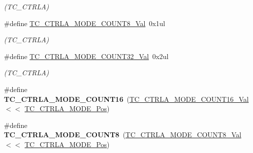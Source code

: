 \begin{DoxyCompactItemize}
\begin{DoxyCompactList}\small\item\em (T\+C\+\_\+\+C\+T\+R\+L\+A) \end{DoxyCompactList}\item 
\hypertarget{group___s_a_m_l21___t_c_ga5e47a24a6c4391f521cae7e09c51fe85}{}\#define \hyperlink{group___s_a_m_l21___t_c_ga5e47a24a6c4391f521cae7e09c51fe85}{T\+C\+\_\+\+C\+T\+R\+L\+A\+\_\+\+M\+O\+D\+E\+\_\+\+C\+O\+U\+N\+T8\+\_\+\+Val}~0x1ul\label{group___s_a_m_l21___t_c_ga5e47a24a6c4391f521cae7e09c51fe85}

\begin{DoxyCompactList}\small\item\em (T\+C\+\_\+\+C\+T\+R\+L\+A) \end{DoxyCompactList}\item 
\hypertarget{group___s_a_m_l21___t_c_gac7e348d6c5100444a6b538d20b420c8c}{}\#define \hyperlink{group___s_a_m_l21___t_c_gac7e348d6c5100444a6b538d20b420c8c}{T\+C\+\_\+\+C\+T\+R\+L\+A\+\_\+\+M\+O\+D\+E\+\_\+\+C\+O\+U\+N\+T32\+\_\+\+Val}~0x2ul\label{group___s_a_m_l21___t_c_gac7e348d6c5100444a6b538d20b420c8c}

\begin{DoxyCompactList}\small\item\em (T\+C\+\_\+\+C\+T\+R\+L\+A) \end{DoxyCompactList}\item 
\hypertarget{group___s_a_m_l21___t_c_ga17918a3e4bf9763601e5af52bb16f8e5}{}\#define {\bfseries T\+C\+\_\+\+C\+T\+R\+L\+A\+\_\+\+M\+O\+D\+E\+\_\+\+C\+O\+U\+N\+T16}~(\hyperlink{group___s_a_m_l21___t_c_gacf36c4f8dfa9af8b7d0b8103ded6df59}{T\+C\+\_\+\+C\+T\+R\+L\+A\+\_\+\+M\+O\+D\+E\+\_\+\+C\+O\+U\+N\+T16\+\_\+\+Val}     $<$$<$ \hyperlink{group___s_a_m_l21___t_c_gaae33620c144befdc20a57898c2d5bb96}{T\+C\+\_\+\+C\+T\+R\+L\+A\+\_\+\+M\+O\+D\+E\+\_\+\+Pos})\label{group___s_a_m_l21___t_c_ga17918a3e4bf9763601e5af52bb16f8e5}

\item 
\hypertarget{group___s_a_m_l21___t_c_ga7847ede9fd73ba3cb0bb500ad2110086}{}\#define {\bfseries T\+C\+\_\+\+C\+T\+R\+L\+A\+\_\+\+M\+O\+D\+E\+\_\+\+C\+O\+U\+N\+T8}~(\hyperlink{group___s_a_m_l21___t_c_ga5e47a24a6c4391f521cae7e09c51fe85}{T\+C\+\_\+\+C\+T\+R\+L\+A\+\_\+\+M\+O\+D\+E\+\_\+\+C\+O\+U\+N\+T8\+\_\+\+Val}      $<$$<$ \hyperlink{group___s_a_m_l21___t_c_gaae33620c144befdc20a57898c2d5bb96}{T\+C\+\_\+\+C\+T\+R\+L\+A\+\_\+\+M\+O\+D\+E\+\_\+\+Pos})\label{group___s_a_m_l21___t_c_ga7847ede9fd73ba3cb0bb500ad2110086}


\end{DoxyCompactItemize}

